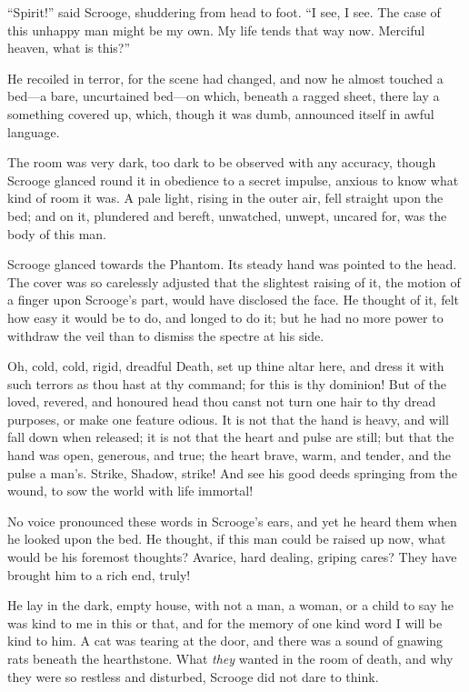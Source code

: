 \documentclass[paper=a5,BCOR=15mm,twoside,DIV=15,headinclude=off,12pt,chapterprefix=off,openany,headings=huge]{scrbook} %
\begin{document}
\enquote{Spirit!} said Scrooge, shuddering from head to foot. \enquote{I see, I see. The case of this unhappy man might be my own. My life tends that way now. Merciful heaven, what is this?}

He recoiled in terror, for the scene had changed, and now he almost touched a bed—a bare, uncurtained bed—on which, beneath a ragged sheet, there lay a something covered up, which, though it was dumb, announced itself in awful language.

The room was very dark, too dark to be observed with any accuracy, though Scrooge glanced round it in obedience to a secret impulse, anxious to know what kind of room it was. A pale light, rising in the outer air, fell straight upon the bed; and on it, plundered and bereft, unwatched, unwept, uncared for, was the body of this man.

Scrooge glanced towards the Phantom. Its steady hand was pointed to the head. The cover was so carelessly adjusted that the slightest raising of it, the motion of a finger upon Scrooge's part, would have disclosed the face. He thought of it, felt how easy it would be to do, and longed to do it; but he had no more power to withdraw the veil than to dismiss the spectre at his side.

Oh, cold, cold, rigid, dreadful Death, set up thine altar here, and dress it with such terrors as thou hast at thy command; for this is thy dominion! But of the loved, revered, and honoured head thou canst not turn one hair to thy dread purposes, or make one feature odious. It is not that the hand is heavy, and will fall down when released; it is not that the heart and pulse are still; but that the hand was open, generous, and true; the heart brave, warm, and tender, and the pulse a man's. Strike, Shadow, strike! And see his good deeds springing from the wound, to sow the world with life immortal!

No voice pronounced these words in Scrooge's ears, and yet he heard them when he looked upon the bed. He thought, if this man could be raised up now, what would be his foremost thoughts? Avarice, hard dealing, griping cares? They have brought him to a rich end, truly!

He lay in the dark, empty house, with not a man, a woman, or a child to say he was kind to me in this or that, and for the memory of one kind word I will be kind to him. A cat was tearing at the door, and there was a sound of gnawing rats beneath the hearthstone. What \textit{they} wanted in the room of death, and why they were so restless and disturbed, Scrooge did not dare to think.
\end{document}
